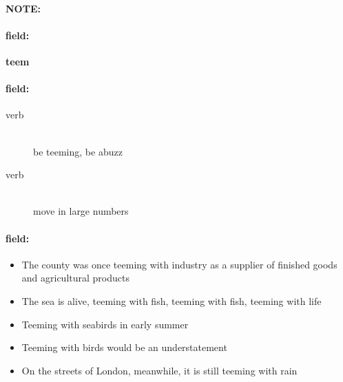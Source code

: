 \documentclass[12pt]{article}
\newenvironment{note}{\paragraph{NOTE:}}{}
\newenvironment{field}{\paragraph{field:}}{}
\begin{document}
\begin{note}
\begin{field}
\textbf{\large teem}
\end{field}


\begin{field}
\begin{description}
\item[verb] \hfill \\ 
be teeming, be abuzz

\item[verb] \hfill \\ 
move in large numbers

\end{description}
\end{field}

\begin{field}
\begin{itemize}
\item The county was once teeming with industry as a supplier of finished goods and agricultural products
\item The sea is alive, teeming with fish, teeming with fish, teeming with life
\item Teeming with seabirds in early summer
\item Teeming with birds would be an understatement
\item On the streets of London, meanwhile, it is still teeming with rain
\end{itemize}
\end{field}
\end{note}
\end{document}
